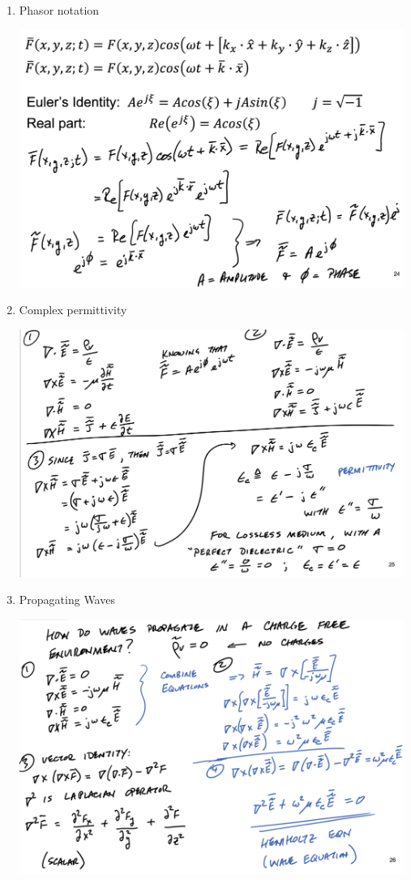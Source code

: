 \documentclass[10pt]{article}
\begin{document}
\begin{enumerate}
	
	\item Phasor notation
	
	\includegraphics[width=0.99\textwidth]{figs/PhasorNotation.png}
	
	
	\item Complex permittivity
	
	\includegraphics[width=0.99\textwidth]{figs/ComplexPermittivity.png}
	
	\item Propagating Waves
	
	\includegraphics[width=0.99\textwidth]{figs/PropagatingWaves.png}


\end{enumerate}
\end{document}
